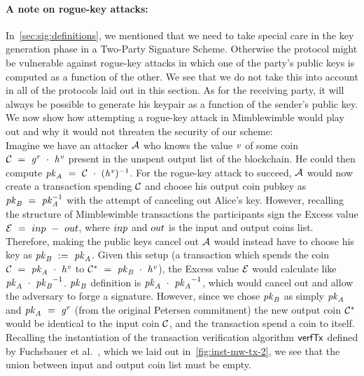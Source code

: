 \paragraph{A note on rogue-key attacks:} In~\cref{sec:sig:definitions}, we mentioned that we need to take special care in the key generation phase in a Two-Party Signature Scheme.
Otherwise the protocol might be vulnerable against rogue-key attacks in which one of the party's public keys is computed as a function of the other.
We see that we do not take this into account in all of the protocols laid out in this section.
As for the receiving party, it will always be possible to generate his keypair as a function of the sender's public key.
We now show how attempting a rogue-key attack in Mimblewimble would play out and why it would not threaten the security of our scheme:\\
Imagine we have an attacker $\mathcal{A}$ who knows the value $\mathit{v}$ of some coin $\mathcal{C} ~=~ \mathit{g}^{\mathit{r}} ~\cdot~ \mathit{h}^{\mathit{v}}$ present in the unspent output list of the blockchain.
He could then compute $\mathit{pk}_{\mathit{A}} ~=~ \mathcal{C} ~\cdot~ {(\mathit{h}^{\mathit{v}}})^{-1}$.
For the rogue-key attack to succeed, $\mathcal{A}$ would now create a transaction spending $\mathcal{C}$ and choose his output coin pubkey as $\mathit{pk}_{\mathit{B}} ~=~ \mathit{pk}_{\mathit{A}}^{-1}$ with the attempt of canceling out Alice's key.
However, recalling the structure of Mimblewimble transactions the participants sign the Excess value $\mathcal{E} ~=~ inp ~-~ out$, where $inp$ and $out$ is the input and output coins list.
Therefore, making the public keys cancel out $\mathcal{A}$ would instead have to choose his key as $\mathit{pk}_{\mathit{B}} ~:=~ \mathit{pk}_{\mathit{A}}$.
Given this setup (a transaction which spends the coin $\mathcal{C} ~=~ \mathit{pk}_{\mathit{A}} ~\cdot~ \mathit{h}^{\mathit{v}}$ to $\mathcal{C}^* ~=~ \mathit{pk}_{\mathit{B}} ~\cdot~\mathit{h}^{\mathit{v}}$), the Excess value $\mathcal{E}$ would calculate like $\mathit{pk}_{\mathit{A}} ~\cdot~ {\mathit{pk}_{\mathit{B}}}^{-1}$.
$\mathit{pk}_{\mathit{B}}$ definition is $\mathit{pk}_{\mathit{A}} ~\cdot~ {\mathit{pk}_{\mathit{A}}}^{-1}$, which would cancel out and allow the adversary to forge a signature.
However, since we chose $\mathit{pk}_{\mathit{B}}$ as simply $\mathit{pk}_{\mathit{A}}$ and $\mathit{pk}_{\mathit{A}} ~=~ \mathit{g}^{\mathit{r}}$ (from the original Petersen commitment) the new output coin $\mathcal{C}^*$ would be identical to the input coin $\mathcal{C}$, and the transaction spend a coin to itself.
Recalling the instantiation of the transaction verification algorithm $\mathsf{verfTx}$ defined by Fuchsbauer et al.~\cite{fuchsbauer2019aggregate}, which we laid out in~\cref{fig:inst-mw-tx-2}, we see that the union between input and output coin list must be empty.

